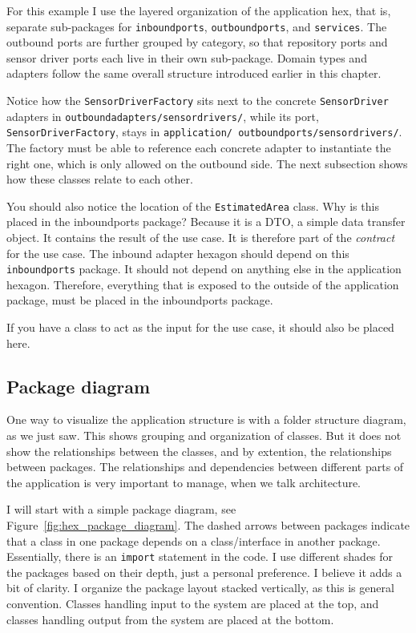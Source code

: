 For this example I use the layered organization of the application hex, that is, separate sub-packages for \texttt{inboundports}, \texttt{outboundports}, and \texttt{services}. The outbound ports are further grouped by category, so that repository ports and sensor driver ports each live in their own sub-package. Domain types and adapters follow the same overall structure introduced earlier in this chapter.





Notice how the \texttt{SensorDriverFactory} sits next to the concrete \texttt{SensorDriver} adapters in \texttt{outboundadapters/sensordrivers/}, while its port, \texttt{SensorDriverFactory}, stays in \texttt{application/ outboundports/sensordrivers/}. The factory must be able to reference each concrete adapter to instantiate the right one, which is only allowed on the outbound side. The next subsection shows how these classes relate to each other.

You should also notice the location of the \texttt{EstimatedArea} class. Why is this placed in the inboundports package? Because it is a DTO, a simple data transfer object. It contains the result of the use case. It is therefore part of the \textit{contract} for the use case. The inbound adapter hexagon should depend on this \texttt{inboundports} package. It should not depend on anything else in the application hexagon. Therefore, everything that is exposed to the outside of the application package, must be placed in the inboundports package.

If you have a class to act as the input for the use case, it should also be placed here.

\subsection{Package diagram}

One way to visualize the application structure is with a folder structure diagram, as we just saw. This shows grouping and organization of classes. But it does not show the relationships between the classes, and by extention, the relationships between packages. The relationships and dependencies between different parts of the application is very important to manage, when we talk architecture. 

I will start with a simple package diagram, see Figure~\ref{fig:hex_package_diagram}. The dashed arrows between packages indicate that a class in one package depends on a class/interface in another package. Essentially, there is an \texttt{import} statement in the code. I use different shades for the packages based on their depth, just a personal preference. I believe it adds a bit of clarity. I organize the package layout stacked vertically, as this is general convention. Classes handling input to the system are placed at the top, and classes handling output from the system are placed at the bottom.

